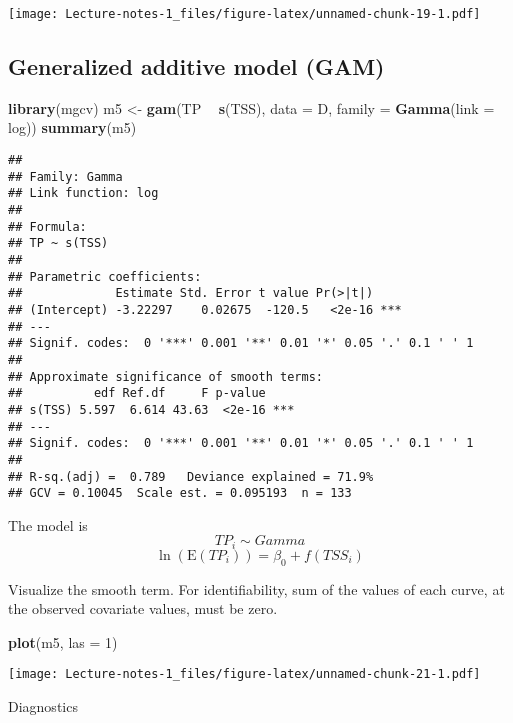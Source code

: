 \documentclass[
]{book}
\newenvironment{Shaded}{\begin{snugshade}}{\end{snugshade}}
\newcommand{\DataTypeTok}[1]{\textcolor[rgb]{0.13,0.29,0.53}{#1}}
\newcommand{\DecValTok}[1]{\textcolor[rgb]{0.00,0.00,0.81}{#1}}
\newcommand{\KeywordTok}[1]{\textcolor[rgb]{0.13,0.29,0.53}{\textbf{#1}}}
\newcommand{\NormalTok}[1]{#1}
\newcommand{\OperatorTok}[1]{\textcolor[rgb]{0.81,0.36,0.00}{\textbf{#1}}}
\newcommand{\StringTok}[1]{\textcolor[rgb]{0.31,0.60,0.02}{#1}}
\begin{document}
\texttt{[image: Lecture-notes-1\_files/figure-latex/unnamed-chunk-19-1.pdf]}

\hypertarget{generalized-additive-model-gam-1}{%
\subsection{Generalized additive model (GAM)}\label{generalized-additive-model-gam-1}}

\begin{Shaded}
\begin{Highlighting}[]
\KeywordTok{library}\NormalTok{(mgcv)}
\NormalTok{m5 <-}\StringTok{ }\KeywordTok{gam}\NormalTok{(TP }\OperatorTok{~}\StringTok{ }\KeywordTok{s}\NormalTok{(TSS), }\DataTypeTok{data =}\NormalTok{ D, }\DataTypeTok{family =} \KeywordTok{Gamma}\NormalTok{(}\DataTypeTok{link =}\NormalTok{ log))}
\KeywordTok{summary}\NormalTok{(m5)}
\end{Highlighting}
\end{Shaded}

\begin{verbatim}
## 
## Family: Gamma 
## Link function: log 
## 
## Formula:
## TP ~ s(TSS)
## 
## Parametric coefficients:
##             Estimate Std. Error t value Pr(>|t|)    
## (Intercept) -3.22297    0.02675  -120.5   <2e-16 ***
## ---
## Signif. codes:  0 '***' 0.001 '**' 0.01 '*' 0.05 '.' 0.1 ' ' 1
## 
## Approximate significance of smooth terms:
##          edf Ref.df     F p-value    
## s(TSS) 5.597  6.614 43.63  <2e-16 ***
## ---
## Signif. codes:  0 '***' 0.001 '**' 0.01 '*' 0.05 '.' 0.1 ' ' 1
## 
## R-sq.(adj) =  0.789   Deviance explained = 71.9%
## GCV = 0.10045  Scale est. = 0.095193  n = 133
\end{verbatim}

The model is
\[TP_i \sim Gamma\]
\[\ln(\text{E}(TP_i)) = \beta_0 + f(TSS_i)\]

Visualize the smooth term. For identifiability, sum of the values of each curve, at the observed covariate values, must be zero.

\begin{Shaded}
\begin{Highlighting}[]
\KeywordTok{plot}\NormalTok{(m5, }\DataTypeTok{las =} \DecValTok{1}\NormalTok{)}
\end{Highlighting}
\end{Shaded}

\texttt{[image: Lecture-notes-1\_files/figure-latex/unnamed-chunk-21-1.pdf]}

Diagnostics
\end{document}
